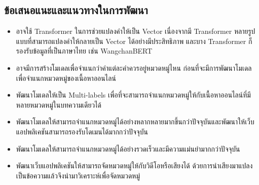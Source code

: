 \documentclass[12pt,oneside,openright,a4paper]{cpe-thai-project}
\begin{document}
  \subsection{ข้อเสนอแนะและแนวทางในการพัฒนา}
    \begin{itemize}
      \item อาจใช้ Transformer ในการช่วยแปลงคำให้เป็น Vector เนื่องจากมี Transformer หลายรูปแบบที่สามารถแปลงคำให้กลายเป็น Vector ได้อย่างมีประสิทธิภาพ
            และบาง Transformer ก็รองรับข้อมูลที่เป็นภาษาไทย เช่น WangchanBERT
      \item อาจมีการสร้างโมเดลเพื่อจำแนกว่าคำแต่ละคำควรอยู่หมวดหมู่ไหน ก่อนที่จะมีการพัฒนาโมเดลเพื่อจำแนกหมวดหมู่ของเนื้อหาออนไลน์
      \item พัฒนาโมเดลให้เป็น Multi-labels เพื่อที่จะสามารถจำแนกหมวดหมู่ให้กับเนื้อหาออนไลน์ที่มีหลายหมวดหมู่ในบทความเดียวได้
      \item พัฒนาโมเดลให้สามารถจำแนกหมวดหมู่ได้อย่างหลากหลายมากขึ้นกว่าปัจจุบันและพัฒนาให้เว็บแอปพลิเคชันสามารถรองรับโดเมนได้มากกว่าปัจจุบัน
      \item พัฒนาโมเดลให้สามารถจำแนกหมวดหมู่ได้อย่างรวดเร็วและมีความแม่นยำมากกว่าปัจจุบัน
      \item พัฒนาเว็บแอปพลิเคชันให้สามารถจัดหมวดหมู่ให้กับวิดีโอหรือเสียงได้ ด้วยการนำเสียงมาแปลงเป็นข้อความแล้วจึงนำมาวิเคราะห์เพื่อจัดหมวดหมู่
    \end{itemize}




\makeatletter
\g@addto@macro{\UrlBreaks}{\UrlOrds}
\makeatother




\end{document}
